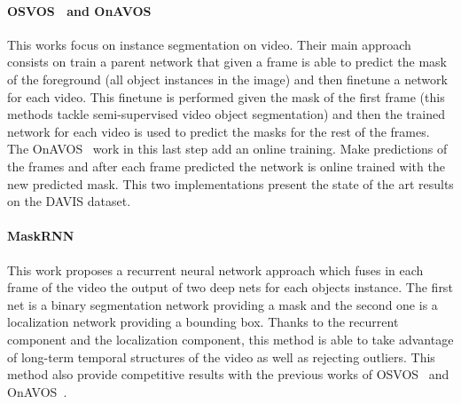 \paragraph{OSVOS~\cite{caelles2017one} and OnAVOS~\cite{voigtlaender17BMVC}}
This works focus on instance segmentation on video.
Their main approach consists on train a parent network that given a frame is able to predict the mask of the foreground (all object instances in the image) and then finetune a network for each video.
This finetune is performed given the mask of the first frame (this methods tackle semi-supervised video object segmentation) and then the trained network for each video is used to predict the masks for the rest of the frames.
The OnAVOS~\cite{voigtlaender17BMVC} work in this last step add an online training. Make predictions of the frames and after each frame predicted the network is online trained with the new predicted mask.
This two implementations present the state of the art results on the DAVIS dataset.

\paragraph{MaskRNN~\cite{NIPS2017_6636}}
This work proposes a recurrent neural network approach which fuses in each frame of the video the output of two deep nets for each objects instance.
The first net is a binary segmentation network providing a mask and the second one is a localization network providing a bounding box.
Thanks to the recurrent component and the localization component, this method is able to take advantage of long-term temporal structures of the video as well as rejecting outliers.
This method also provide competitive results with the previous works of OSVOS~\cite{caelles2017one} and OnAVOS~\cite{voigtlaender17BMVC}.

